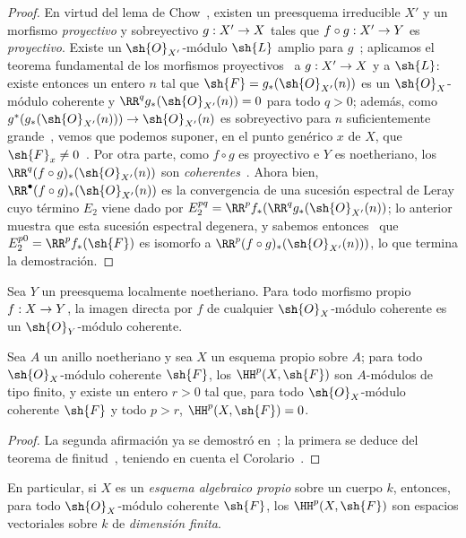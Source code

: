 \documentclass[oneside]{amsart}
\makeatletter
\newcommand{\ega@arrow}[2]{\mathchoice{#1}{#2}{#2}{#2}}
\renewcommand{\to}{\ega@arrow{\longrightarrow}{\rightarrow}}
\let\EGAOriginalLabel\label
\renewcommand{\label}[1]{\phantomsection\EGAOriginalLabel{#1}}
\makeatother
\begin{document}
\begin{proof}
En virtud del lema de Chow~, existen un preesquema irreducible $X'$ y un morfismo \emph{proyectivo} y sobreyectivo $g:X'\to X$ tales que $f\circ g:X'\to Y$ es \emph{proyectivo}.
Existe un $\sh{O}_{X'}$-módulo $\sh{L}$ amplio para $g$~; aplicamos el teorema fundamental de los morfismos proyectivos~ a $g:X'\to X$ y a $\sh{L}$: existe entonces un entero $n$ tal que $\sh{F}=g_*(\sh{O}_{X'}(n))$ es un $\sh{O}_X$-módulo coherente y $\RR^q g_*(\sh{O}_{X'}(n))=0$ para todo $q>0$; además, como $g^*(g_*(\sh{O}_{X'}(n)))\to\sh{O}_{X'}(n)$ es sobreyectivo para $n$ suficientemente grande~, vemos que podemos suponer, en el punto genérico $x$ de $X$, que $\sh{F}_x\neq 0$~.
Por otra parte, como $f\circ g$ es proyectivo e $Y$ es noetheriano, los $\RR^q(f\circ g)_*(\sh{O}_{X'}(n))$ son \emph{coherentes}~.
Ahora bien, $\RR^\bullet(f\circ g)_*(\sh{O}_{X'}(n))$ es la convergencia de una sucesión espectral de Leray cuyo término $E_2$ viene dado por $E_2^{pq}=\RR^p f_*(\RR^q g_*(\sh{O}_{X'}(n))$; lo anterior muestra que esta sucesión espectral degenera, y sabemos entonces~ que $E_2^{p0}=\RR^p f_*(\sh{F})$ es isomorfo a $\RR^p(f\circ g)_*(\sh{O}_{X'}(n)))$, lo que termina la demostración.
\end{proof}

\begin{corollary}[3.2.2]
\label{III.3.2.2}
Sea $Y$ un preesquema localmente noetheriano.
Para todo morfismo propio $f:X\to Y$, la imagen directa por $f$ de cualquier $\sh{O}_X$-módulo coherente es un $\sh{O}_Y$-módulo coherente.
\end{corollary}

\begin{corollary}[3.2.3]
\label{III.3.2.3}
Sea $A$ un anillo noetheriano y sea $X$ un esquema propio sobre $A$; para todo $\sh{O}_X$-módulo coherente $\sh{F}$, los $\HH^p(X,\sh{F})$ son $A$-módulos de tipo finito, y existe un entero $r>0$ tal que, para todo $\sh{O}_X$-módulo coherente $\sh{F}$ y todo $p>r$, $\HH^p(X,\sh{F})=0$.
\end{corollary}

\begin{proof}
La segunda afirmación ya se demostró en~; la primera se deduce del teorema de finitud~, teniendo en cuenta el Corolario~.
\end{proof}

En particular, si $X$ es un \emph{esquema algebraico propio} sobre un cuerpo $k$, entonces, para todo $\sh{O}_X$-módulo coherente $\sh{F}$, los $\HH^p(X,\sh{F})$ son espacios vectoriales sobre $k$ de \emph{dimensión finita}.
\end{document}
